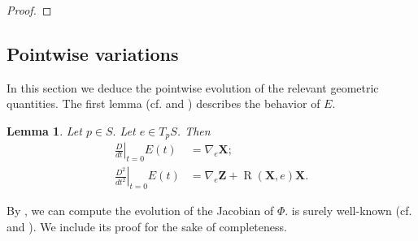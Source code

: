 \documentclass[11pt]{amsart}
\newcommand{\X}{\mathbf{X}}
\newcommand{\Z}{\mathbf{Z}}
\DeclareMathOperator{\R}{R}
\newtheorem{lemma}[theorem]{Lemma}
\theoremstyle{definition}
\theoremstyle{remark}
\numberwithin{equation}{section}
\begin{document}
\begin{proof}
    \end{proof}    \subsection{Pointwise variations} In this section we deduce the pointwise evolution of the relevant geometric quantities. 
    The first lemma (cf. \cite[Lemma 1.13]{MR4676392} and \cite[Lemma 1.22]{MR4676392}) describes the behavior of $E$.
    \begin{lemma}\label{lemmaevolutiondie}
    Let $p\in S.$ Let $e\in T_p S$. Then 
    \begin{align}
        \left.\frac{D}{dt}\right|_{t=0}E(t)&=\nabla_{e}\X;\label{prounoaux}\\
        \left.\frac{D^2}{dt^2}\right|_{t=0}E(t)&=\nabla_{e}\Z+\R(\X,e)\X.\label{produeaux}
    \end{align}
\end{lemma}
By , we can compute the evolution of the Jacobian of $\Phi$.  is surely well-known (cf. \cite[Theorem 1.11]{MR4676392} and \cite[Theorem 1.21]{MR4676392}). We include its proof for the sake of completeness.
\end{document}
